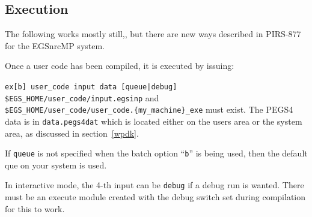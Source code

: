 % 



\subsection{Execution}
\label{Execution}

The following works mostly still,, but there are new ways described in
PIRS-877\cite{Ka03} for the EGSnrcMP system.


Once a user code has been compiled, it is executed by issuing:

\hspace*{1cm}\verb+ex[b] user_code input data [queue|debug]+\vspace*{5mm}\\
\verb+$EGS_HOME/user_code/input.egsinp+ and\\
\verb+$EGS_HOME/user_code/user_code.{my_machine}_exe+ must exist.  The
PEGS4 data is in \verb+data.pegs4dat+ which is located either on
the users area or the system area, as discussed in section~\ref{wpdk}.

If \verb+queue+ is not specified when the batch option ``{\tt b}'' is being
used, then the default que on your system is used.  

In interactive mode, the 4-th input can be \verb+debug+ if a debug run
is wanted.  There must be an execute module created with the debug
switch set during compilation for this to work.

